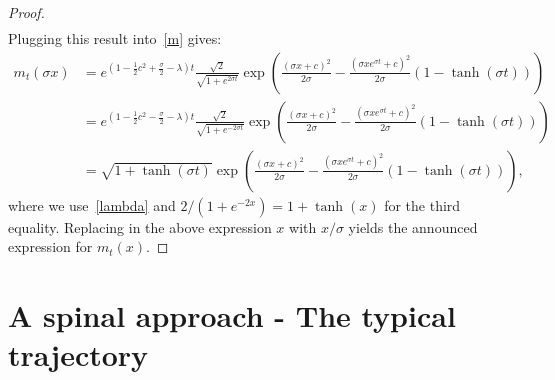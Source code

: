 \documentclass[10pt]{amsart}
\theoremstyle{definition}\newtheorem{defi}[theo]{Definition}\newtheorem{rema}[theo]{Remark}\newtheorem{exam}[theo]{Example}\newtheorem{exem}[theo]{Example}\newtheorem{nota}[theo]{Notation}
\begin{document}
\begin{proof}
\begin{align*}
\end{align*}
Plugging this result into~\eqref{m} gives:
\begin{align*}
m_{t}(\sigma x) &=e^{\left(1-\frac{1}{2}c^2+\frac{\sigma}{2}-\lambda\right)t}\frac{\sqrt{2}}{\sqrt{1+e^{2\sigma t}}}\exp\left(\frac{(\sigma x+c)^2}{2\sigma}-\frac{\left(\sigma xe^{\sigma t}+c \right)^2}{2\sigma}\left(1-\tanh(\sigma t)\right) \right)\\
 &= e^{\left(1-\frac{1}{2}c^2-\frac{\sigma}{2}-\lambda\right)t}\frac{\sqrt{2}}{\sqrt{1+e^{-2\sigma t}}}\exp\left(\frac{(\sigma x+c)^2}{2\sigma}-\frac{\left(\sigma xe^{\sigma t}+c \right)^2}{2\sigma}\left(1-\tanh(\sigma t)\right) \right)\\
&=\sqrt{1+\tanh(\sigma t)}\exp\left(\frac{(\sigma x+c)^2}{2\sigma}-\frac{\left(\sigma xe^{\sigma t}+c \right)^2}{2\sigma}\left(1-\tanh(\sigma t)\right) \right),
\end{align*}
where we use~\eqref{lambda} and $2/(1+e^{-2x})=1+\tanh(x)$ for the third equality. Replacing in the above expression $x$ with $x/\sigma$ yields the announced expression for $m_t(x)$.
\end{proof}

\section{A spinal approach - The typical trajectory}\label{sec:spinal}
\end{document}
